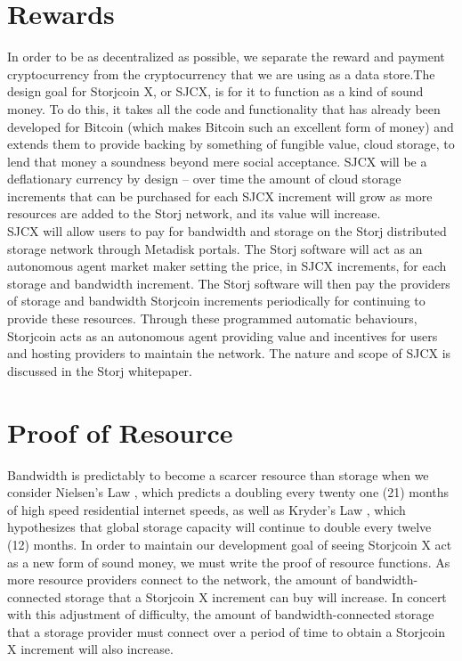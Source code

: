 \documentclass[a4paper,10pt]{article}
\begin{document}
\section*{Rewards}

In order to be as decentralized as possible, we separate the reward and payment cryptocurrency from the cryptocurrency that we are using as a data store.The design goal for Storjcoin X, or SJCX, is for it to function as a kind of sound money.  To do this, it takes all the code and functionality that has already been developed for Bitcoin (which makes Bitcoin such an excellent form of money) and extends them to provide backing by something of fungible value, cloud storage, to lend that money a soundness beyond mere social acceptance. SJCX will be a deflationary currency by design -- over time the amount of cloud storage increments that can be purchased for each SJCX increment will grow as more resources are added to the Storj network, and its value will increase.\\

SJCX will allow users to pay for bandwidth and storage on the Storj distributed storage network through Metadisk portals.  The Storj software will act as an autonomous agent market maker setting the price, in SJCX increments, for each storage and bandwidth increment.  The Storj software will then pay the providers of storage and bandwidth Storjcoin increments periodically for continuing to provide these resources. Through these programmed automatic behaviours, Storjcoin acts as an autonomous agent providing value and incentives for users and hosting providers to maintain the network. The nature and scope of SJCX is discussed in the Storj whitepaper.

\section*{Proof of Resource}

Bandwidth is predictably to become a scarcer resource than storage when we consider Nielsen’s Law \cite{16}, which predicts a doubling every twenty one (21) months of high speed residential internet speeds, as well as Kryder’s Law \cite{17}, which hypothesizes that global storage capacity will continue to double every twelve (12) months.  In order to maintain our development goal of seeing Storjcoin X act as a new form of sound money, we must write the proof of resource functions. As more resource providers connect to the network, the amount of bandwidth-connected storage that a Storjcoin X increment can buy will increase.  In concert with this adjustment of difficulty, the amount of bandwidth-connected storage that a storage provider must connect over a period of time to obtain a Storjcoin X increment will also increase.  \\
\end{document}
